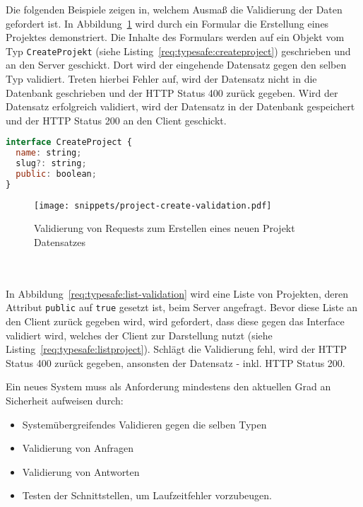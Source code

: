 Die folgenden Beispiele zeigen in, welchem Ausmaß die Validierung der Daten gefordert ist. In Abbildung~\ref{req:typesafe:request-validation} wird durch ein Formular die Erstellung eines Projektes demonstriert. Die Inhalte des Formulars werden auf ein Objekt vom Typ \texttt{CreateProjekt} (siehe Listing~\ref{req:typesafe:createproject}) geschrieben und an den Server geschickt. Dort wird der eingehende Datensatz gegen den selben Typ validiert. Treten hierbei Fehler auf, wird der Datensatz nicht in die Datenbank geschrieben und der HTTP Status 400 zurück gegeben.
Wird der Datensatz erfolgreich validiert, wird der Datensatz in der Datenbank gespeichert und der HTTP Status 200 an den Client geschickt.

\begin{lstlisting}[language=Javascript,float=h!,caption={Interface zum Erstellen eines Projektes}, label={req:typesafe:createproject}]
interface CreateProject {
  name: string;
  slug?: string;
  public: boolean;
}
\end{lstlisting}

\begin{figure}[h!]
	\centering
	\texttt{[image: snippets/project-create-validation.pdf]}
	\caption{Validierung von Requests zum Erstellen eines neuen Projekt Datensatzes}
	\label{req:typesafe:request-validation}
\end{figure}

\ \\
\ \\

In Abbildung~\ref{req:typesafe:list-validation} wird eine Liste von Projekten, deren Attribut \texttt{public} auf \texttt{true} gesetzt ist, beim Server angefragt. Bevor diese Liste an den Client zurück gegeben wird, wird gefordert, dass diese gegen das Interface validiert wird, welches der Client zur Darstellung nutzt (siehe Listing~\ref{req:typesafe:listproject}). Schlägt die Validierung fehl, wird der HTTP Status 400 zurück gegeben, ansonsten der Datensatz - inkl. HTTP Status 200.



Ein neues System muss als Anforderung mindestens den aktuellen Grad an Sicherheit aufweisen durch:

\begin{itemize}
    \setlength\itemsep{-1em}
    \item Systemübergreifendes Validieren gegen die selben Typen
    \item Validierung von Anfragen
    \item Validierung von Antworten
    \item Testen der Schnittstellen, um Laufzeitfehler vorzubeugen.
\end{itemize}

